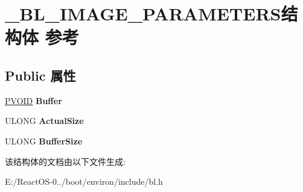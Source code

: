 \hypertarget{struct___b_l___i_m_a_g_e___p_a_r_a_m_e_t_e_r_s}{}\section{\+\_\+\+B\+L\+\_\+\+I\+M\+A\+G\+E\+\_\+\+P\+A\+R\+A\+M\+E\+T\+E\+R\+S结构体 参考}
\label{struct___b_l___i_m_a_g_e___p_a_r_a_m_e_t_e_r_s}
\subsection*{Public 属性}
\begin{DoxyCompactItemize}
\item 
\mbox{\label{struct___b_l___i_m_a_g_e___p_a_r_a_m_e_t_e_r_s_a2ccb5b8e276844e6645bf4fcf374e590}} 
\hyperlink{interfacevoid}{P\+V\+O\+ID} {\bfseries Buffer}
\item 
\mbox{\label{struct___b_l___i_m_a_g_e___p_a_r_a_m_e_t_e_r_s_a4d465fc9695bce1172c2dd148940839e}} 
U\+L\+O\+NG {\bfseries Actual\+Size}
\item 
\mbox{\label{struct___b_l___i_m_a_g_e___p_a_r_a_m_e_t_e_r_s_a3dd120e799203731cdae7dfb72dfc3aa}} 
U\+L\+O\+NG {\bfseries Buffer\+Size}
\end{DoxyCompactItemize}


该结构体的文档由以下文件生成\+:\begin{DoxyCompactItemize}
\item 
E\+:/\+React\+O\+S-\/0../boot/environ/include/bl.\+h\end{DoxyCompactItemize}

